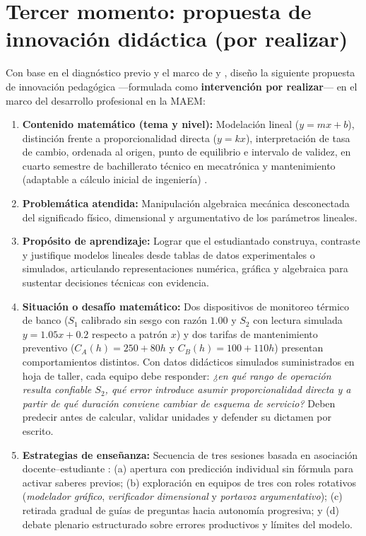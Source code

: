 \documentclass[spanish,letterpaper,oneside]{article}
\begin{document}
\section{Tercer momento: propuesta de innovación didáctica (por realizar)}
Con base en el diagnóstico previo y el marco de \citet{quiroga2022aprendizaje} y \citet{rivas2017innovaciones}, diseño la siguiente propuesta de innovación pedagógica —formulada como \textbf{intervención por realizar}— en el marco del desarrollo profesional en la MAEM:

\begin{tcolorbox}[colback=iiiepePale,colframe=iiiepeNavy,title=\textbf{Ficha técnica de la innovación · «Calibrar y comparar para decidir» (por realizar)},breakable]
\begin{enumerate}
  \item \textbf{Contenido matemático (tema y nivel):} Modelación lineal ($y = mx + b$), distinción frente a proporcionalidad directa ($y = kx$), interpretación de tasa de cambio, ordenada al origen, punto de equilibrio e intervalo de validez, en cuarto semestre de bachillerato técnico en mecatrónica y mantenimiento (adaptable a cálculo inicial de ingeniería) \citep{sep2023pensamiento,conalep2025mecatronica}.
  \item \textbf{Problemática atendida:} Manipulación algebraica mecánica desconectada del significado físico, dimensional y argumentativo de los parámetros lineales.
  \item \textbf{Propósito de aprendizaje:} Lograr que el estudiantado construya, contraste y justifique modelos lineales desde tablas de datos experimentales o simulados, articulando representaciones numérica, gráfica y algebraica para sustentar decisiones técnicas con evidencia.
  \item \textbf{Situación o desafío matemático:} Dos dispositivos de monitoreo térmico de banco ($S_1$ calibrado sin sesgo con razón $1.00$ y $S_2$ con lectura simulada $y = 1.05x + 0.2$ respecto a patrón $x$) y dos tarifas de mantenimiento preventivo ($C_A(h) = 250 + 80h$ y $C_B(h) = 100 + 110h$) presentan comportamientos distintos. Con datos didácticos simulados suministrados en hoja de taller, cada equipo debe responder: \textit{¿en qué rango de operación resulta confiable $S_2$, qué error introduce asumir proporcionalidad directa y a partir de qué duración conviene cambiar de esquema de servicio?} Deben predecir antes de calcular, validar unidades y defender su dictamen por escrito.
  \item \textbf{Estrategias de enseñanza:} Secuencia de tres sesiones basada en asociación docente--estudiante \citep{fullan2014rich}: (a) apertura con predicción individual sin fórmula para activar saberes previos; (b) exploración en equipos de tres con roles rotativos (\textit{modelador gráfico}, \textit{verificador dimensional} y \textit{portavoz argumentativo}); (c) retirada gradual de guías de preguntas hacia autonomía progresiva; y (d) debate plenario estructurado sobre errores productivos y límites del modelo.

\end{enumerate}
\end{tcolorbox}
\end{document}
